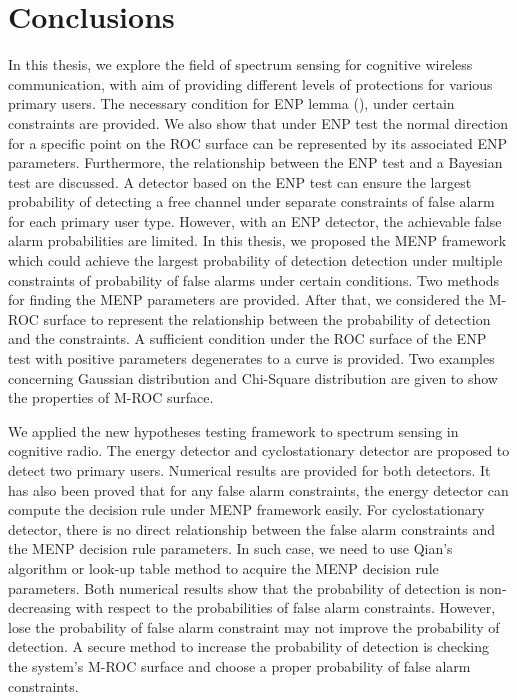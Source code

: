\chapter{Conclusions}
In this thesis, we explore the field of spectrum sensing for cognitive wireless communication, with aim of providing different levels of protections for various primary users. The necessary condition for ENP lemma (), under certain constraints are provided. We also show that under ENP test the normal direction for a specific point on the ROC surface can be represented by its associated ENP parameters. Furthermore, the relationship between the ENP test and a Bayesian test are discussed. 
A detector based on the ENP test can ensure the largest probability of detecting a free channel under separate constraints of false alarm  for each primary user type. However, with an ENP detector, the achievable false alarm probabilities are limited.  
In this thesis, we proposed the MENP framework which could achieve the largest probability of detection detection under multiple constraints of probability of false alarms under certain conditions. Two methods for finding the MENP parameters are provided. 
After that, we considered the M-ROC surface to represent the relationship between the probability of detection and the constraints. A sufficient condition under the ROC surface of the ENP test with positive parameters degenerates to a curve is provided.  Two examples concerning Gaussian distribution and Chi-Square distribution are given to show the properties of M-ROC surface.

We applied the new hypotheses testing framework to spectrum sensing in cognitive radio. The energy detector and cyclostationary detector are proposed to detect two primary users. Numerical results are provided for both detectors. It has also been proved that for any false alarm constraints, the energy detector can compute the decision rule under MENP framework easily. For cyclostationary detector, there is no direct relationship between the false alarm constraints and the MENP decision rule parameters. In such case, we need to use Qian's algorithm or look-up table method to acquire the MENP decision rule parameters. Both numerical results show that the probability of detection is non-decreasing with respect to the probabilities of false alarm constraints. However, lose the probability of false alarm constraint may not improve the probability of detection. A secure method to increase the probability of detection is checking the system's M-ROC surface and choose a proper probability of false alarm constraints.  

